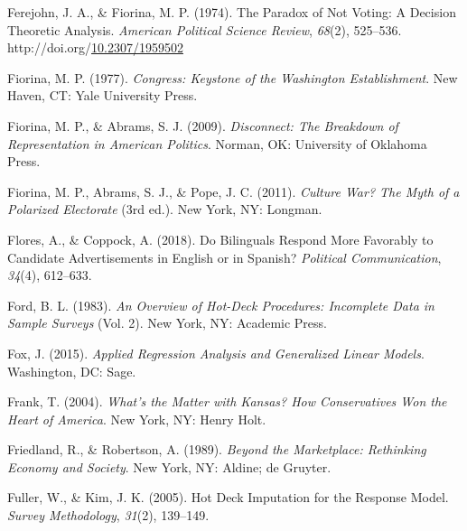 \documentclass[12pt,econ]{sources/authesis}
\newenvironment{CSLReferences}%
  {}%
  {\par}
\begin{document}
\begin{CSLReferences}{1}{0}
\leavevmode{}%
Ferejohn, J. A., \& Fiorina, M. P. (1974). The {Paradox} of {Not} {Voting}: {A} {Decision} {Theoretic} {Analysis}. \emph{American Political Science Review}, \emph{68}(2), 525--536. http://doi.org/\href{https://doi.org/10.2307/1959502}{10.2307/1959502}

\leavevmode{}%
Fiorina, M. P. (1977). \emph{Congress: {Keystone} of the {Washington} {Establishment}}. New Haven, CT: Yale University Press.

\leavevmode{}%
Fiorina, M. P., \& Abrams, S. J. (2009). \emph{Disconnect: {The} {Breakdown} of {Representation} in {American} {Politics}}. Norman, OK: University of Oklahoma Press.

\leavevmode{}%
Fiorina, M. P., Abrams, S. J., \& Pope, J. C. (2011). \emph{Culture {War}? {The} {Myth} of a {Polarized} {Electorate}} (3rd ed.). New York, NY: Longman.

\leavevmode{}%
Flores, A., \& Coppock, A. (2018). {Do Bilinguals Respond More Favorably to Candidate Advertisements in English or in Spanish?} \emph{Political Communication}, \emph{34}(4), 612--633.

\leavevmode{}%
Ford, B. L. (1983). \emph{{An Overview of Hot-Deck Procedures: Incomplete Data in Sample Surveys}} (Vol. 2). New York, NY: Academic Press.

\leavevmode{}%
Fox, J. (2015). \emph{Applied {Regression} {Analysis} and {Generalized} {Linear} {Models}}. Washington, DC: Sage.

\leavevmode{}%
Frank, T. (2004). \emph{What's the {Matter} with {Kansas}? {How} {Conservatives} {Won} the {Heart} of {America}}. New York, NY: Henry Holt.

\leavevmode{}%
Friedland, R., \& Robertson, A. (1989). \emph{Beyond the {Marketplace}: {Rethinking} {Economy} and {Society}}. New York, NY: Aldine; de Gruyter.

\leavevmode{}%
Fuller, W., \& Kim, J. K. (2005). {Hot Deck Imputation for the Response Model}. \emph{Survey Methodology}, \emph{31}(2), 139--149.


\end{CSLReferences}
\end{document}
